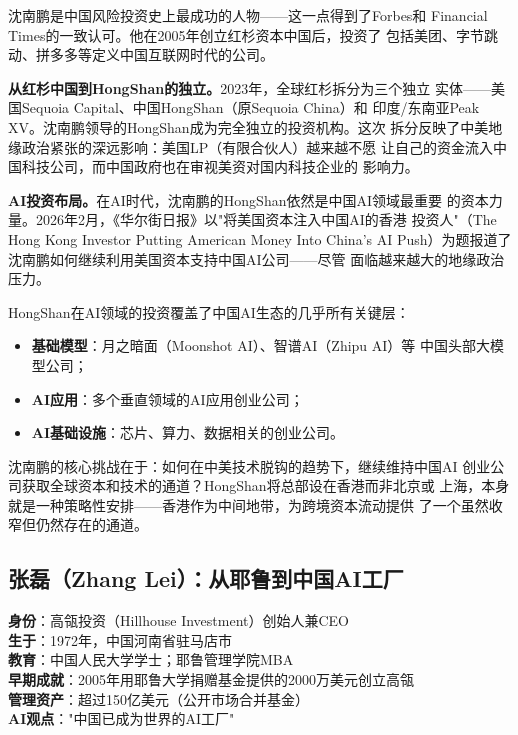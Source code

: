 沈南鹏是中国风险投资史上最成功的人物——这一点得到了Forbes和
Financial Times的一致认可。他在2005年创立红杉资本中国后，投资了
包括美团、字节跳动、拼多多等定义中国互联网时代的公司。

\textbf{从红杉中国到HongShan的独立。}2023年，全球红杉拆分为三个独立
实体——美国Sequoia Capital、中国HongShan（原Sequoia China）和
印度/东南亚Peak XV。沈南鹏领导的HongShan成为完全独立的投资机构。这次
拆分反映了中美地缘政治紧张的深远影响：美国LP（有限合伙人）越来越不愿
让自己的资金流入中国科技公司，而中国政府也在审视美资对国内科技企业的
影响力。

\textbf{AI投资布局。}在AI时代，沈南鹏的HongShan依然是中国AI领域最重要
的资本力量。2026年2月，《华尔街日报》以"将美国资本注入中国AI的香港
投资人"（The Hong Kong Investor Putting American Money Into China's AI
Push）为题报道了沈南鹏如何继续利用美国资本支持中国AI公司——尽管
面临越来越大的地缘政治压力。

HongShan在AI领域的投资覆盖了中国AI生态的几乎所有关键层：
\begin{itemize}
  \item \textbf{基础模型}：月之暗面（Moonshot AI）、智谱AI（Zhipu AI）等
    中国头部大模型公司；
  \item \textbf{AI应用}：多个垂直领域的AI应用创业公司；
  \item \textbf{AI基础设施}：芯片、算力、数据相关的创业公司。
\end{itemize}

沈南鹏的核心挑战在于：如何在中美技术脱钩的趋势下，继续维持中国AI
创业公司获取全球资本和技术的通道？HongShan将总部设在香港而非北京或
上海，本身就是一种策略性安排——香港作为中间地带，为跨境资本流动提供
了一个虽然收窄但仍然存在的通道。


\subsection{张磊（Zhang Lei）：从耶鲁到中国AI工厂}
\label{subsec:inv-zhanglei}

\begin{corebox}
\textbf{身份}：高瓴投资（Hillhouse Investment）创始人兼CEO \\
\textbf{生于}：1972年，中国河南省驻马店市 \\
\textbf{教育}：中国人民大学学士；耶鲁管理学院MBA \\
\textbf{早期成就}：2005年用耶鲁大学捐赠基金提供的2000万美元创立高瓴 \\
\textbf{管理资产}：超过150亿美元（公开市场合并基金） \\
\textbf{AI观点}："中国已成为世界的AI工厂"
\end{corebox}

